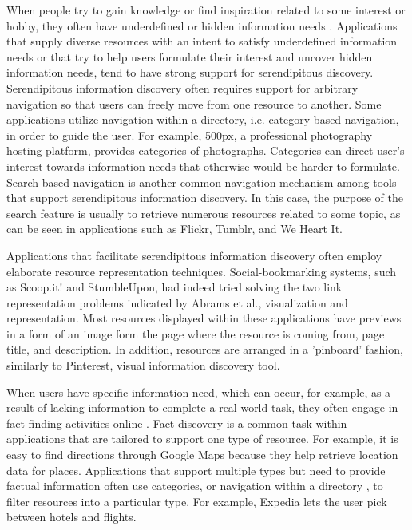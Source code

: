 \documentclass{casconpaper}
\begin{document}
{When people try to gain knowledge or find inspiration related to some interest or hobby, they often have underdefined or hidden information needs \cite{lindley}. Applications that supply diverse resources with an intent to satisfy underdefined information needs or that try to help users formulate their interest and uncover hidden information needs, tend to have strong support for serendipitous discovery. Serendipitous information discovery often requires support for arbitrary navigation so that users can freely move from one resource to another. Some applications utilize navigation within a directory, i.e. category-based navigation, in order to guide the user. For example, 500px, a professional photography hosting platform, provides categories of photographs. Categories can direct user's interest towards information needs that otherwise would be harder to formulate. Search-based navigation is another common navigation mechanism among tools that support serendipitous information discovery. In this case, the purpose of the search feature is usually to retrieve numerous resources related to some topic, as can be seen in applications such as Flickr, Tumblr, and We Heart It. 

Applications that facilitate serendipitous information discovery often employ elaborate resource representation techniques. Social-bookmarking systems, such as Scoop.it! and StumbleUpon, had indeed tried solving the two link representation problems indicated by Abrams et al.\cite{abrams}, visualization and representation.  Most resources displayed within these applications have previews in a form of an image form the page where the resource is coming from, page title, and description. In addition, resources are arranged in a 'pinboard' fashion, similarly to Pinterest, visual information discovery tool.

When users have specific information need, which can occur, for example, as a result of lacking information to complete a real-world task, they often engage in fact finding activities online \cite{kellar2006, kellar2007, sellen}. Fact discovery is a common task within applications that are tailored to support one type of resource. For example, it is easy to find directions through Google Maps because they help retrieve location data for places. Applications that support multiple types but need to provide factual information often use categories, or navigation within a directory \cite{levene}, to filter resources into a particular type. For example, Expedia lets the user pick between hotels and flights. 

}
\end{document}
